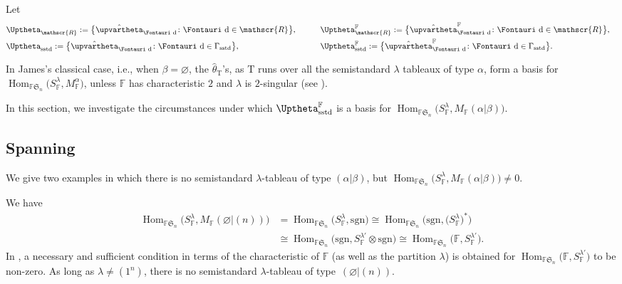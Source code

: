 \documentclass[pdftex]{sigma}
\newcommand{\T}{\mathrm{T}}
\newcommand{\sgn}{\mathrm{sgn}}
\newcommand{\Hom}{\operatorname{Hom}}
\newcommand{\sym}[1]{\mathfrak{S}_{#1}}
\newcommand{\F}{\mathbb{F}}
\newcommand{\R}{\mathscr{R}}
\newcommand{\dR}{\text{\Fontauri d}}
\newcommand{\Jhom}{\upvartheta}
\newcommand{\hJhom}{\hat{\Jhom}}
\newcommand{\JHOM}{\Uptheta}
\newcommand{\hJHOM}{{\JHOM}}
\begin{document}
Let
\begin{alignat*}{3}
 & \hJHOM_{\R}:=\big\{ \hJhom_{\dR} \colon \dR \in \R \big\},\qquad & & \hJHOM^\F_{\R}:=\big\{ \hJhom_{\dR}^\F \colon \dR \in \R \big\}, & \\
 & \hJHOM_{\mathrm{sstd}}:=\big\{ \hJhom_{\dR} \colon \dR \in \Gamma_{\mathrm{sstd}} \big\},\qquad && \hJHOM^\F_{\mathrm{sstd}}:=\big\{ \hJhom_{\dR}^\F \colon \dR \in \Gamma_{\mathrm{sstd}} \big\}.&
\end{alignat*}

In James's classical case, i.e., when $\beta=\varnothing$, the $\hat{\theta}_{\T}$'s, as $\T$ runs over all the semistandard $\lambda$ tableaux of type $\alpha$, form a basis for $\Hom_{\F\sym{n}}\big(S_\F^\lambda,M_\F^\alpha\big)$, unless $\F$ has characteristic $2$ and $\lambda$ is $2$-singular (see \cite[Theorem~13.13]{GJ}).

In this section, we investigate the circumstances under which $\hJHOM_{\mathrm{sstd}}^\F$ is a basis for \linebreak $\Hom_{\F\sym{n}}\big(S_\F^\lambda,M_\F(\alpha|\beta)\big)$.

\subsection{Spanning}

We give two examples in which there is no semistandard $\lambda$-tableau of type $(\alpha|\beta)$, but \linebreak $\Hom_{\F\sym{n}}\big(S_\F^\lambda,M_\F(\alpha|\beta)\big)\ne 0$.

\begin{Example} \label{E:Jameseg}
We have
\begin{align*}
\Hom_{\F\sym{n}}\big(S_{\F}^{\lambda}, M_{\F}(\varnothing|(n))\big)
&= \Hom_{\F\sym{n}}\big(S_{\F}^{\lambda}, \sgn\big)
\cong\Hom_{\F\sym{n}}\big(\sgn, \big(S_{\F}^{\lambda}\big)^*\big) \\
&\cong \Hom_{\F\sym{n}}\big(\sgn, S_{\F}^{\lambda'} \otimes \sgn\big)
\cong \Hom_{\F\sym{n}}\big(\F, S_{\F}^{\lambda'}\big).
\end{align*}
In \cite[Theorem~24.4]{GJ}, a necessary and sufficient condition in terms of the characteristic of $\F$ (as well as the partition $\lambda$) is obtained for $\Hom_{\F\sym{n}}\big(\F, S_{\F}^{\lambda'}\big)$ to be non-zero. As long as $\lambda \ne (1^n)$, there is no semistandard $\lambda$-tableau of type~$(\varnothing|(n))$.
\end{Example}
\end{document}
